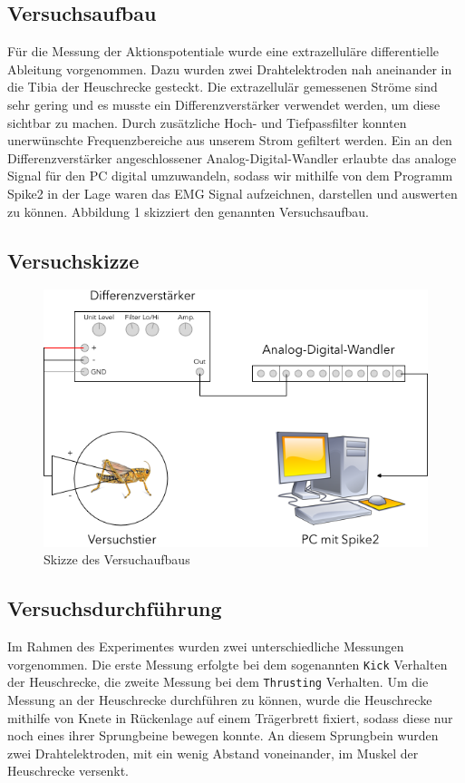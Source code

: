 \documentclass[a4paper]{article}
\begin{document}
\subsection{Versuchsaufbau}
Für die Messung der Aktionspotentiale wurde eine extrazelluläre differentielle Ableitung vorgenommen. Dazu wurden zwei Drahtelektroden nah aneinander in die Tibia der Heuschrecke gesteckt. Die extrazellulär gemessenen Ströme sind sehr gering und es musste ein Differenzverstärker verwendet werden, um diese sichtbar zu machen. Durch zusätzliche Hoch- und Tiefpassfilter konnten unerwünschte Frequenzbereiche aus unserem Strom gefiltert werden. Ein an den Differenzverstärker angeschlossener Analog-Digital-Wandler erlaubte das analoge Signal für den PC digital umzuwandeln, sodass wir mithilfe von dem Programm Spike2 \cite{Spike2:Online} in der Lage waren das EMG Signal aufzeichnen, darstellen und auswerten zu können. Abbildung 1 skizziert den genannten Versuchsaufbau.

\subsection{Versuchskizze} 
\vspace{2.5\baselineskip}
\begin{figure}[H]
    \centering
    \includegraphics[scale=0.6]{images/Versuchsaufbau.png}
    \caption{Skizze des Versuchaufbaus}
\end{figure}


\newpage
\subsection{Versuchsdurchführung}
Im Rahmen des Experimentes wurden zwei unterschiedliche Messungen vorgenommen. Die erste Messung erfolgte bei dem sogenannten \texttt{Kick} Verhalten der Heuschrecke, die zweite Messung bei dem \texttt{Thrusting} Verhalten. Um die Messung an der Heuschrecke durchführen zu können, wurde die Heuschrecke mithilfe von Knete in Rückenlage auf einem Trägerbrett fixiert, sodass diese nur noch eines ihrer Sprungbeine bewegen konnte. An diesem Sprungbein wurden zwei Drahtelektroden, mit ein wenig Abstand voneinander, im Muskel der Heuschrecke versenkt.  
\end{document}
